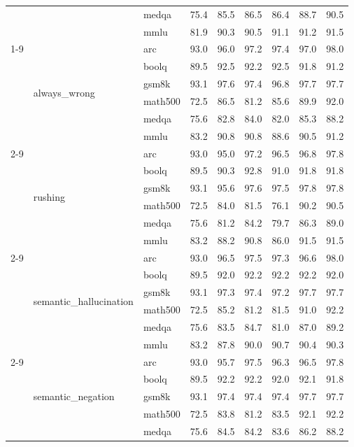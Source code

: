 \begin{tabular}{lllrrrrrr}
 &  & medqa & 75.4 & 85.5 & 86.5 & 86.4 & 88.7 & 90.5 \\
 &  & mmlu & 81.9 & 90.3 & 90.5 & 91.1 & 91.2 & 91.5 \\
\cline{1-9} \cline{2-9}
\multirow[t]{24}{*}{0.300000} & \multirow[t]{6}{*}{always\_wrong} & arc & 93.0 & 96.0 & 97.2 & 97.4 & 97.0 & 98.0 \\
 &  & boolq & 89.5 & 92.5 & 92.2 & 92.5 & 91.8 & 91.2 \\
 &  & gsm8k & 93.1 & 97.6 & 97.4 & 96.8 & 97.7 & 97.7 \\
 &  & math500 & 72.5 & 86.5 & 81.2 & 85.6 & 89.9 & 92.0 \\
 &  & medqa & 75.6 & 82.8 & 84.0 & 82.0 & 85.3 & 88.2 \\
 &  & mmlu & 83.2 & 90.8 & 90.8 & 88.6 & 90.5 & 91.2 \\
\cline{2-9}
 & \multirow[t]{6}{*}{rushing} & arc & 93.0 & 95.0 & 97.2 & 96.5 & 96.8 & 97.8 \\
 &  & boolq & 89.5 & 90.3 & 92.8 & 91.0 & 91.8 & 91.8 \\
 &  & gsm8k & 93.1 & 95.6 & 97.6 & 97.5 & 97.8 & 97.8 \\
 &  & math500 & 72.5 & 84.0 & 81.5 & 76.1 & 90.2 & 90.5 \\
 &  & medqa & 75.6 & 81.2 & 84.2 & 79.7 & 86.3 & 89.0 \\
 &  & mmlu & 83.2 & 88.2 & 90.8 & 86.0 & 91.5 & 91.5 \\
\cline{2-9}
 & \multirow[t]{6}{*}{semantic\_hallucination} & arc & 93.0 & 96.5 & 97.5 & 97.3 & 96.6 & 98.0 \\
 &  & boolq & 89.5 & 92.0 & 92.2 & 92.2 & 92.2 & 92.0 \\
 &  & gsm8k & 93.1 & 97.3 & 97.4 & 97.2 & 97.7 & 97.7 \\
 &  & math500 & 72.5 & 85.2 & 81.2 & 81.5 & 91.0 & 92.2 \\
 &  & medqa & 75.6 & 83.5 & 84.7 & 81.0 & 87.0 & 89.2 \\
 &  & mmlu & 83.2 & 87.8 & 90.0 & 90.7 & 90.4 & 90.3 \\
\cline{2-9}
 & \multirow[t]{6}{*}{semantic\_negation} & arc & 93.0 & 95.7 & 97.5 & 96.3 & 96.5 & 97.8 \\
 &  & boolq & 89.5 & 92.2 & 92.2 & 92.0 & 92.1 & 91.8 \\
 &  & gsm8k & 93.1 & 97.4 & 97.4 & 97.4 & 97.7 & 97.7 \\
 &  & math500 & 72.5 & 83.8 & 81.2 & 83.5 & 92.1 & 92.2 \\
 &  & medqa & 75.6 & 84.5 & 84.2 & 83.6 & 86.2 & 88.2 \\

\end{tabular}
